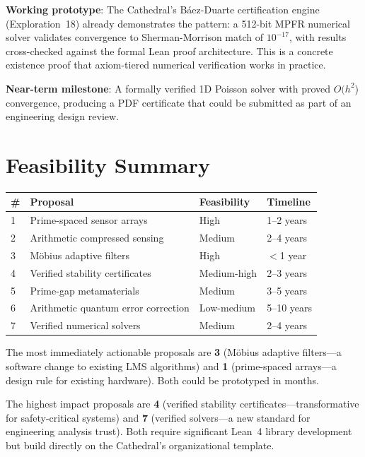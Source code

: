 \documentclass[11pt,a4paper]{article}
\begin{document}
\textbf{Working prototype}: The Cathedral's B\'aez-Duarte certification
engine (Exploration~18) already demonstrates the pattern: a 512-bit
MPFR numerical solver validates convergence to Sherman-Morrison match
of $10^{-17}$, with results cross-checked against the formal Lean
proof architecture. This is a concrete existence proof that
axiom-tiered numerical verification works in practice.

\textbf{Near-term milestone}: A formally verified 1D Poisson solver
with proved $O(h^2$) convergence, producing a PDF certificate that
could be submitted as part of an engineering design review.

\section{Feasibility Summary}
\label{sec:summary}

\begin{center}
\begin{tabular}{@{}llll@{}}
\toprule
\textbf{\#} & \textbf{Proposal} & \textbf{Feasibility} & \textbf{Timeline} \\
\midrule
1 & Prime-spaced sensor arrays & High & 1--2 years \\
2 & Arithmetic compressed sensing & Medium & 2--4 years \\
3 & M\"obius adaptive filters & High & $<$1 year \\
4 & Verified stability certificates & Medium-high & 2--3 years \\
5 & Prime-gap metamaterials & Medium & 3--5 years \\
6 & Arithmetic quantum error correction & Low-medium & 5--10 years \\
7 & Verified numerical solvers & Medium & 2--4 years \\
\bottomrule
\end{tabular}
\end{center}

The most immediately actionable proposals are \textbf{3} (M\"obius
adaptive filters---a software change to existing LMS algorithms)
and \textbf{1} (prime-spaced arrays---a design rule for existing
hardware). Both could be prototyped in months.

The highest impact proposals are \textbf{4} (verified stability
certificates---transformative for safety-critical systems) and
\textbf{7} (verified solvers---a new standard for engineering
analysis trust). Both require significant Lean~4 library
development but build directly on the Cathedral's organizational
template.
\end{document}
